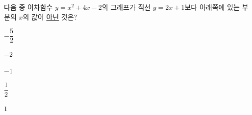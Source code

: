 다음 중 이차함수 $y=x^2+4x-2$의 그래프가 직선 $y=2x+1$보다 아래쪽에 있는 부분의 $x$의 값이 \underline{아닌} 것은?
\begin{choicesii}{\rule[-3ex]{0pt}{8ex}$-\dfrac{5}{2}$}{\rule[-3ex]{0pt}{8ex}$-2$}{\rule[-3ex]{0pt}{8ex}$-1$}{\rule[-3ex]{0pt}{8ex}$\dfrac{1}{2}$}{\rule[-3ex]{0pt}{8ex}$1$}\end{choicesii}
